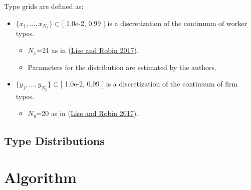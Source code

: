\documentclass[
  letterpaper,
  DIV=11,
  numbers=noendperiod]{scrreprt}
\providecommand{\tightlist}{%
  \setlength{\itemsep}{0pt}\setlength{\parskip}{0pt}}\usepackage{longtable,booktabs,array}
\begin{document}
Type grids are defined as:

\begin{itemize}
\item
  \(\{x_1,\ldots,x_{N_x}\}\subset[\) 1.0e-2, 0.99 \(]\) is a
  discretization of the continuum of worker types.

  \begin{itemize}
  \item
    \(N_x\)=21 as in
    (\protect\hyperlink{ref-liseMacrodynamicsSortingWorkers2017}{Lise
    and Robin 2017}).
  \item
    Parameters for the distribution are estimated by the authors.
  \end{itemize}
\item
  \(\{y_1,\ldots,y_{N_y}\}\subset[\) 1.0e-2, 0.99 \(]\) is a
  discretization of the continuum of firm types.

  \begin{itemize}
  \tightlist
  \item
    \(N_y\)=20 as in
    (\protect\hyperlink{ref-liseMacrodynamicsSortingWorkers2017}{Lise
    and Robin 2017}).
  \end{itemize}
\end{itemize}

\hypertarget{type-distributions}{%
\subsection{Type Distributions}\label{type-distributions}}

\hypertarget{algorithm}{%
\section{Algorithm}\label{algorithm}}
\end{document}

